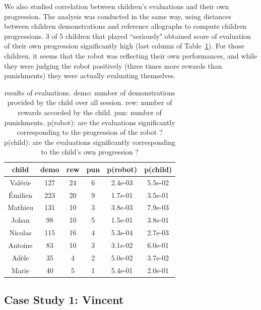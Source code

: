 \documentclass{article}
\begin{document}
We also studied correlation between children's evaluations and their own
progression. The analysis was conducted in the same way, using distances between
children demonstrations and reference allographs to compute children
progressions.  3 of 5 children that played ``seriously" obtained score of
evaluation of their own progression significantly high (last column of
Table~\ref{table:scores}). For those children, it seems that the robot was
reflecting their own performances, and while they were judging the robot
positively (three times more rewards than punishments) they were actually
evaluating themselves.

\begin{table}
    \centering
    \begin{tabular}{|c|c|c|c|c|c|}
        \hline
        child & demo & rew & pun & p(robot) & p(child)\\ \hline
        Valérie & 127 & 24 & 6 & 2.4e-03 & 5.5e-02\\ \hline
        Émilien & 223 & 20 & 9 & 1.7e-01 & 3.5e-01\\ \hline
        Mathieu & 131 & 10 & 3 & 3.8e-03 & 7.9e-03\\ \hline
        Johan & 98 & 10 & 5 &  1.5e-01 & 3.8e-01\\ \hline
        Nicolas & 115 & 16 & 4 & 5.3e-04 & 2.7e-03\\ \hline
        Antoine & 83 & 10 & 3 & 3.1e-02 & 6.0e-01\\ \hline
        Adèle & 35 & 4 & 2 & 5.0e-02 & 3.7e-02\\ \hline
        Marie & 40 & 5 & 1 &  5.4e-01 & 2.0e-01\\ \hline
    \end{tabular}
    \caption{\small results of evaluations. demo: number of demonstrations provided by
        the child over all session. rew: number of rewards accorded by
        the child. pun: number of punishments. p(robot): are the evaluations
        significantly corresponding to the progression of the robot ? p(child): are the
        evaluations significantly corresponding to the child's own
progression ?}
    \label{table:scores}
\end{table}

\subsection{Case Study 1: Vincent}
\end{document}
